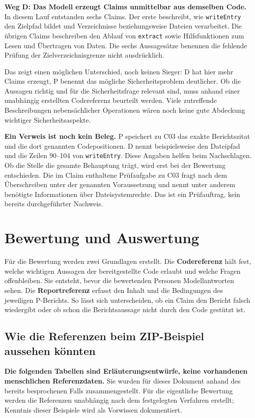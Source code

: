 \documentclass[10pt,a4paper]{article}
\begin{document}
\textbf{Weg D: Das Modell erzeugt Claims unmittelbar aus demselben Code.} In diesem Lauf entstanden sechs Claims. Der erste beschreibt, wie \texttt{writeEntry} den Zielpfad bildet und Verzeichnisse beziehungsweise Dateien verarbeitet. Die übrigen Claims beschreiben den Ablauf von \texttt{extract} sowie Hilfsfunktionen zum Lesen und Übertragen von Daten. Die sechs Aussagesätze benennen die fehlende Prüfung der Zielverzeichnisgrenze nicht ausdrücklich.

Das zeigt einen möglichen Unterschied, noch keinen Sieger: D hat hier mehr Claims erzeugt, P benennt das mögliche Sicherheitsproblem deutlicher. Ob die Aussagen richtig und für die Sicherheitsfrage relevant sind, muss anhand einer unabhängig erstellten Codereferenz beurteilt werden. Viele zutreffende Beschreibungen nebensächlicher Operationen wären noch keine gute Abdeckung wichtiger Sicherheitsaspekte.

\textbf{Ein Verweis ist noch kein Beleg.} P speichert zu C03 das exakte Berichtszitat und die dort genannten Codepositionen. D nennt beispielsweise den Dateipfad und die Zeilen 90--104 von \texttt{writeEntry}. Diese Angaben helfen beim Nachschlagen. Ob die Stelle die gesamte Behauptung trägt, wird erst bei der Bewertung entschieden. Die im Claim enthaltene Prüfaufgabe zu C03 fragt nach dem Überschreiben unter der genannten Voraussetzung und nennt unter anderem benötigte Informationen über Dateisystemrechte. Das ist ein Prüfauftrag, kein bereits durchgeführter Nachweis.

\newpage
\section{Bewertung und Auswertung}
Für die Bewertung werden zwei Grundlagen erstellt. Die \textbf{Codereferenz} hält fest, welche wichtigen Aussagen der bereitgestellte Code erlaubt und welche Fragen offenbleiben. Sie entsteht, bevor die bewertenden Personen Modellantworten sehen. Die \textbf{Reportreferenz} erfasst den Inhalt und die Bedingungen des jeweiligen P-Berichts. So lässt sich unterscheiden, ob ein Claim den Bericht falsch wiedergibt oder ob schon die Berichtsaussage nicht durch den Code gestützt ist.

\subsection{Wie die Referenzen beim ZIP-Beispiel aussehen könnten}
\textbf{Die folgenden Tabellen sind Erläuterungsentwürfe, keine vorhandenen menschlichen Referenzdaten.} Sie wurden für dieses Dokument anhand des bereits besprochenen Falls zusammengestellt. Für die eigentliche Bewertung werden die Referenzen unabhängig nach dem festgelegten Verfahren erstellt; Kenntnis dieser Beispiele wird als Vorwissen dokumentiert.
\end{document}
